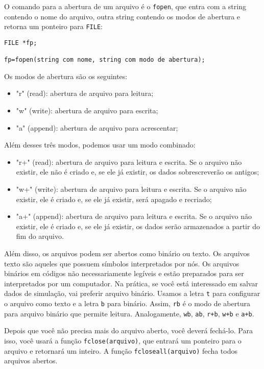 O comando para a abertura de um arquivo é o \verb|fopen|, que entra com a string contendo o nome do arquivo, outra string contendo os modos de abertura e retorna um ponteiro para \verb|FILE|:
\begin{verbatim}
FILE *fp;

fp=fopen(string com nome, string com modo de abertura);
\end{verbatim}
Os modos de abertura são os seguintes:
\begin{itemize}
 \item "r" (read): abertura de arquivo para leitura;
 \item "w" (write): abertura de arquivo para escrita;
 \item "a" (append): abertura de arquivo para acrescentar;
\end{itemize}
Além desses três modos, podemos usar um modo combinado:
\begin{itemize}
 \item "r+" (read): abertura de arquivo para leitura e escrita. Se o arquivo não existir, ele não é criado e, se ele já existir, os dados sobrescreverão os antigos;
 \item "w+" (write): abertura de arquivo para leitura e escrita. Se o arquivo não existir, ele é criado e, se ele já existir, será apagado e recriado;
 \item "a+" (append): abertura de arquivo para leitura e escrita. Se o arquivo não existir, ele é criado e, se ele já existir, os dados serão armazenados a partir do fim do arquivo.
\end{itemize}


Além disso, os arquivos podem ser abertos como binário ou texto. Os arquivos texto são aqueles que possuem símbolos interpretados por nós. Os arquivos binários em códigos não necessariamente legíveis e estão preparados para ser interpretados por um computador. Na prática, se você está interessado em salvar dados de simulação, vai preferir arquivo binário. Usamos a letra \verb|t| para configurar o arquivo como texto e a letra \verb|b| para binário. Assim, \verb|rb| é o modo de abertura para arquivo binário que permite leitura. Analogamente, \verb|wb|, \verb|ab|, \verb|r+b|, \verb|w+b| e \verb|a+b|.

Depois que você não precisa mais do arquivo aberto, você deverá fechá-lo. Para isso, você usará a função \verb|fclose(arquivo)|, que entrará um ponteiro para o arquivo e retornará um inteiro. A função \verb|fcloseall(arquivo)| fecha todos arquivos abertos.


